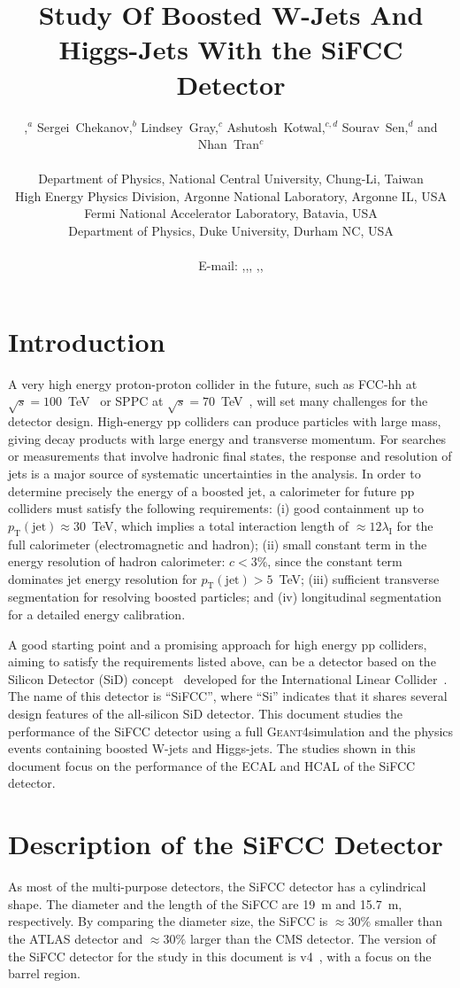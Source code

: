 \documentclass{PoS}
\title{Study Of Boosted W-Jets And Higgs-Jets With the SiFCC Detector}
\author{\speaker{Shin-Shan~Yu},$^{a}$ Sergei~Chekanov,$^{b}$ Lindsey~Gray,$^{c}$ Ashutosh~Kotwal,$^{c,d}$ Sourav~Sen,$^{d}$ and Nhan~Tran$^{c}$\\ \\
        \llap{$^a$}Department of Physics, National Central University, Chung-Li, Taiwan\\
        \llap{$^b$}High Energy Physics Division, Argonne National Laboratory, Argonne IL, USA\\
        \llap{$^c$}Fermi National Accelerator Laboratory, Batavia, USA\\
        \llap{$^d$}Department of Physics, Duke University, Durham NC, USA\\\\
        E-mail: \email{syu@cern.ch},\email{chekanov@anl.gov},\email{lagray@fnal.gov},
        \email{kotwal@phy.duke.edu},\email{ss567@phy.duke.edu},\email{ntran@fnal.gov}}
\newcommand{\ptj}{\ensuremath{p_{\mathrm{T}}(\mathrm{jet})}}
\newcommand{\GEANTfour} {{\textsc{Geant4}}}
\begin{document}
\section{Introduction}
A very high energy proton-proton collider in the future, such as FCC-hh 
at $\sqrt{s}=100$~TeV~\cite{FCC-hh} or 
SPPC at $\sqrt{s}=70$~TeV~\cite{SPPC-one,SPPC-two,SPPC-three}, 
will set many challenges for the detector design. High-energy pp colliders 
can produce particles with large mass, giving decay products with large energy 
and transverse momentum. For searches or measurements that involve hadronic 
final states, the response and resolution of jets is a major source of 
systematic uncertainties in the analysis. 
In order to determine precisely the energy of a 
boosted jet, a calorimeter for future pp colliders must satisfy the following 
requirements: (i)
 good containment up to $\ptj\approx 30$~TeV, which implies a total 
 interaction length of $\approx 12 \lambda_\mathrm{I}$ for the full 
 calorimeter (electromagnetic and hadron); 
 (ii) small constant term in the energy resolution of hadron calorimeter: 
$c < 3\%$, since the constant term dominates jet energy resolution for 
$\ptj>5$~TeV;
 (iii) sufficient transverse segmentation for resolving boosted particles;
 and (iv) longitudinal segmentation for a detailed energy calibration.

A good starting point and a promising approach for high energy pp colliders, 
aiming to satisfy the requirements listed above, 
can be a detector based on the Silicon Detector (SiD) concept~\cite{sid} 
developed for the International Linear Collider~\cite{ILCone,ILCtwo}. The 
name of this detector is ``SiFCC'', where ``Si'' indicates that it 
shares several design features of the all-silicon SiD detector. 
%
This document studies the performance of the SiFCC detector using 
a full \GEANTfour simulation and the physics events containing 
boosted W-jets and Higgs-jets. The studies shown in this document 
focus on the performance of the ECAL and HCAL of the SiFCC detector.

\section{Description of the SiFCC Detector} 
As most of the multi-purpose detectors, the SiFCC detector has a 
cylindrical shape. The diameter and the length of the SiFCC are 19~m 
and 15.7~m, respectively. By comparing the diameter size, 
the SiFCC is $\approx 30\%$ smaller than the ATLAS detector and 
$\approx 30\%$ larger than the CMS detector. 
The version of the SiFCC detector for the study in this document 
is v4~\cite{SiFCCv4}, with a focus on the barrel region. 
\end{document}
